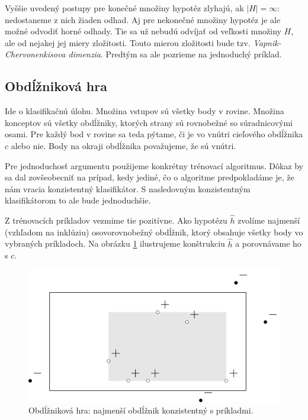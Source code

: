 Vyššie uvedený postupy pre konečné množiny hypotéz zlyhajú, ak
$|H| = \infty$: nedostaneme z nich žiaden odhad. Aj pre nekonečné
množiny hypotéz je ale možné odvodiť horné odhady. Tie sa už nebudú
odvíjať od veľkosti množiny $H$, ale od nejakej jej miery zložitosti.
Touto mierou zložitosti bude tzv. \emph{Vapnik-Chervonenkisova dimenzia}.
Predtým sa ale pozrieme na jednoduchý príklad.




\subsection{Obdĺžniková hra}

Ide o klasifikačnú úlohu. Množina vstupov sú všetky body v rovine.
Množina konceptov sú všetky obdĺžniky, ktorých strany sú rovnobežné
so súradnicovými osami. Pre každý bod v rovine sa teda pýtame, či je
vo vnútri cieľového obdĺžnika $c$ alebo nie. Body na okraji obdĺžnika
považujeme, že sú vnútri.

Pre jednoduchosť argumentu použijeme konkrétny trénovací algoritmus.
Dôkaz by sa dal zovšeobecniť na prípad, kedy jediné, čo o algoritme
predpokladáme je, že nám vracia konzistentný klasifikátor. S nasledovným
konzistentným klasifikátorom to ale bude jednoduchšie.

\medskip

Z trénovacích príkladov vezmime tie pozitívne. Ako hypotézu $\hat{h}$
zvolíme najmenší (vzhľadom na inklúziu) osovorovnobežný obdĺžnik,
ktorý obsahuje všetky body vo vybraných príkladoch. Na obrázku
\ref{rectgame:hath} ilustrujeme konštrukciu $\hat{h}$ a porovnávame
ho s $c$.

\begin{figure}
  \centering
  \includegraphics[scale=1]{obrazky/rectgame1.pdf}
  \caption{Obdĺžniková hra: najmenší obdĺžnik konzistentný s príkladmi.}
  \label{rectgame:hath}
\end{figure}

